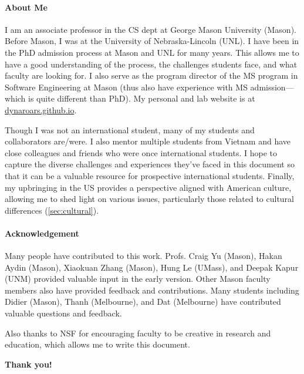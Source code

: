 \documentclass[oneside,11pt,dvipsnames]{book}
\begin{document}
\paragraph{About Me} I am an associate professor in the CS dept at George Mason University (Mason). Before Mason, I was at the University of Nebraska-Lincoln (UNL). I have been in the PhD admission process at Mason and UNL for many years. This allows me to have a good understanding of the process, the challenges students face, and what faculty are looking for. I also serve as the program director of the MS program in Software Engineering at Mason (thus also have experience with MS admission---which is quite different than PhD). My personal and lab website is at \href{https://dynaroars.github.io}{dynaroars.github.io}.

Though I was not an international student, many of my students and collaborators are/were. I also mentor multiple students from Vietnam and have close colleagues and friends who were once international students. I hope to capture the diverse challenges and experiences they've faced in this document so that it can be a valuable resource for prospective international students.
Finally, my upbringing in the US provides a perspective aligned with American culture, allowing me to shed light on various issues, particularly those related to cultural differences (\autoref{sec:cultural}).




\paragraph{Acknowledgement} Many people have contributed to this work.
Profs. Craig Yu (Mason), Hakan Aydin (Mason), 
Xiaokuan Zhang (Mason), Hung Le (UMass), and Deepak Kapur (UNM) provided valuable input in the early version. Other Mason faculty members also have provided feedback and contributions.  Many students including Didier (Mason), Thanh (Melbourne), and Dat (Melbourne) have contributed valuable questions and feedback. 

Also thanks to NSF for encouraging faculty to be creative in research and education, which allows me to write this document. 

\textbf{Thank you!}

%
%
\end{document}

